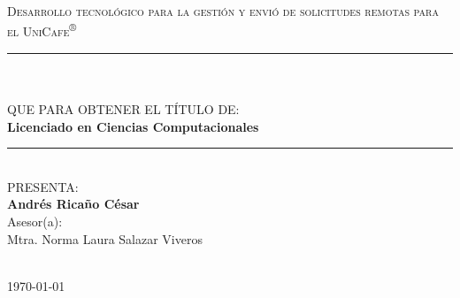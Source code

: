 \documentclass[11pt,letterpaper]{book}
\begin{document}
	\begin{minipage}[c][0.7\textheight][t]{0.2\textwidth}
		\begin{center}
			\hskip2pt
			\vrule width2.5pt height13cm
			\hskip1mm
			\vrule width1pt height13cm
		\end{center}
	\end{minipage}
	\begin{minipage}[c][0.6\textheight][t]{0.65\textwidth}
		\begin{center}
			{\Large\scshape{Desarrollo tecnológico para la gestión y envió de solicitudes remotas para el UniCafe}\textsuperscript{®}}\\
			\vspace{1.25cm}
            \rule{\linewidth}{0.25 mm}\\[10pt]
			\\[6pt]
			QUE PARA OBTENER EL TÍTULO DE:\\[6pt]
			{\large \textbf{{Licenciado en Ciencias Computacionales}}}\\
            \rule{\linewidth}{0.25 mm}\\[45pt]
			PRESENTA:\\[3pt]
			\textbf{Andrés Ricaño César}\\
			\vspace{1cm}
			\small{Asesor(a):\\{Mtra. Norma Laura Salazar Viveros}}
			\end{center}
			\vspace{1cm}
			\\{\monthyeardate\today}
	\end{minipage}


\newpage
\thispagestyle{empty}



\end{document}
